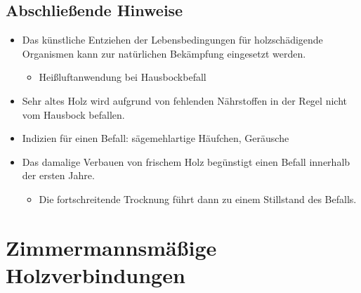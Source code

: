\documentclass[fleqn,twoside]{article}
\begin{document}
    \subsection{Abschließende Hinweise}
        \begin{itemize}
            \item Das künstliche Entziehen der Lebensbedingungen für holzschädigende Organismen kann zur natürlichen Bekämpfung eingesetzt werden.
                \begin{itemize}
                    \item Heißluftanwendung bei Hausbockbefall
                \end{itemize}
            \item Sehr altes Holz wird aufgrund von fehlenden Nährstoffen in der Regel nicht vom Hausbock befallen.
            \item Indizien für einen Befall: sägemehlartige Häufchen, Geräusche
            \item Das damalige Verbauen von frischem Holz begünstigt einen Befall innerhalb der ersten Jahre.
                \begin{itemize}
                    \item Die fortschreitende Trocknung führt dann zu einem Stillstand des Befalls.
                \end{itemize}
        \end{itemize}
        
    

\newpage
\section{Zimmermannsmäßige Holzverbindungen}
\end{document}
